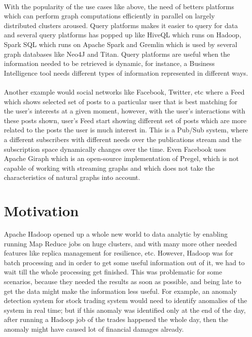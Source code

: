 \documentclass[12pt]{report}
\numberwithin{figure}{section}
\numberwithin{table}{section}
\begin{document}
\paragraph{}

With the popularity of the use cases like above, the need of betters platforms which can perform graph computations efficiently in parallel on largely distributed clusters aroused. Query platforms makes it easier to query for data and several query platforms has popped up like HiveQL which runs on Hadoop, Spark SQL which runs on Apache Spark and Gremlin which is used by several graph databases like Neo4J and Titan. Query platforms are useful when the information needed to be retrieved is dynamic, for instance, a Business Intelligence tool needs different types of information represented in different ways.

\paragraph{}

Another example would social networks like Facebook, Twitter, etc where a Feed which shows selected set of posts to a particular user that is best matching for the user’s interests at a given moment, however, with the user’s interactions with these posts shown, user’s Feed start showing different set of posts which are more related to the posts the user is much interest in. This is a Pub/Sub system, where a different subscribers with different needs over the publications stream and the subscription space dynamically changes over the time. Even Facebook uses\cite{Facebook} Apache Giraph which is an open-source implementation of Pregel\cite{Pregel}, which is not capable of working with streaming graphs and which does not take the characteristics of natural graphs into account. 

\section{Motivation}

Apache Hadoop opened up a whole new world to data analytic by enabling running Map Reduce jobs on huge clusters, and with many more other needed features like replica management for resilience, etc. However, Hadoop was for batch processing and in order to get some useful information out of it, we had to wait till the whole processing get finished. This was problematic for some scenarios, because they needed the results as soon as possible, and being late to get the data might make the information less useful. For example, an anomaly detection system for stock trading system would need to identify anomalies of the system in real time; but if this anomaly was identified only at the end of the day, after running a Hadoop job of the trades happened the whole day, then the anomaly might have caused lot of financial damages already. 
\end{document}
